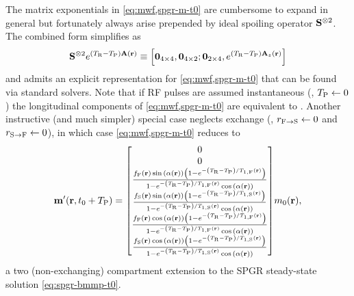 The matrix exponentials 
in \eqref{eq:mwf,spgr-m-t0} 
are cumbersome to expand in general
but fortunately always arise
prepended by ideal spoiling operator $\mathbf{S}^{\otimes2}$.
The combined form simplifies as
\begin{align}
	\bmSsix e^{\paren{\TR-\TP}\bmA\pr} \equiv
		\brac{\zeros{4 \times 4}, \zeros{4 \times 2}; 
		\zeros{2 \times 4}, e^{\paren{\TR-\TP} \bmAz\pr}}
	\label{eq:mwf,spgr-spoil-simp}
\end{align}
and admits 
an explicit representation 
for \eqref{eq:mwf,spgr-m-t0}
that can be found 
via standard solvers. 
Note that
if RF pulses are assumed instantaneous
(\ie, $T_\mathrm{P} \gets 0$)
the longitudinal components
of \eqref{eq:mwf,spgr-m-t0}
are equivalent to \cite[Eq.~34]{spencer:00:mos}.
Another instructive (and much simpler) special case
neglects exchange
(\ie, $r_{\mathrm{F}\to\mathrm{S}} \gets 0$ and $r_{\mathrm{S}\to\mathrm{F}} \gets 0$),
in which case \eqref{eq:mwf,spgr-m-t0} reduces to
\begin{align}
	\bmmp\paren{\bmr,t_0+\TP} =
	\begin{bmatrix}
		0 \\
		0 \\
		\frac{\ff\pr \sina{\flip\pr}\paren{1-e^{-\paren{\TR-\TP}/\tf{1}\pr}}}
			{1-e^{-\paren{\TR-\TP}/\tf{1}\pr}\cosa{\flip\pr}} \\
		\frac{\fs\pr \sina{\flip\pr}\paren{1-e^{-\paren{\TR-\TP}/\ts{1}\pr}}}
			{1-e^{-\paren{\TR-\TP}/\ts{1}\pr}\cosa{\flip\pr}} \\
		\frac{\ff\pr \cosa{\flip\pr}\paren{1-e^{-\paren{\TR-\TP}/\tf{1}\pr}}}
			{1-e^{-\paren{\TR-\TP}/\tf{1}\pr}\cosa{\flip\pr}} \\
		\frac{\fs\pr \cosa{\flip\pr}\paren{1-e^{-\paren{\TR-\TP}/\ts{1}\pr}}}
			{1-e^{-\paren{\TR-\TP}/\ts{1}\pr}\cosa{\flip\pr}}
	\end{bmatrix}
	\mzero\pr,
	\label{eq:mwf-spgr-m-t0-exchg0}
\end{align}
a two (non-exchanging) compartment extension
to the SPGR steady-state solution \eqref{eq:spgr-bmmp-t0}.

